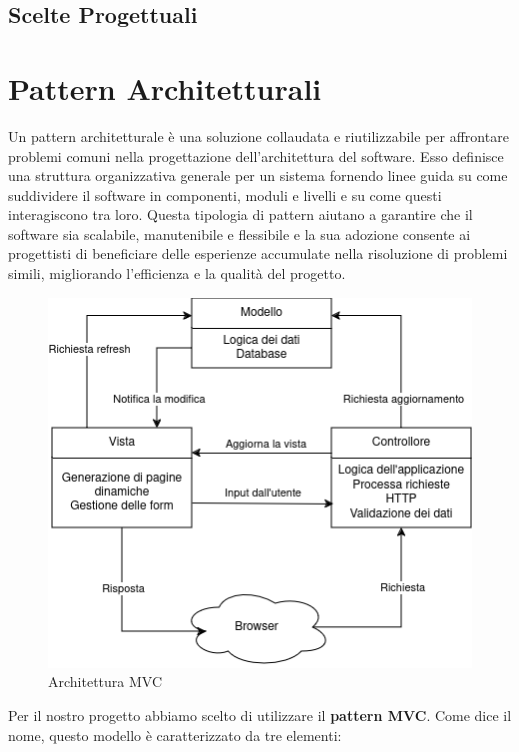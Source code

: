 \documentclass[a4paper, 11pt,oneside]{book}
\newcommand{\spacing}{\par\bigskip\noindent}
\begin{document}
    \section{Scelte Progettuali}


\chapter{Pattern Architetturali}
    Un pattern architetturale è una soluzione collaudata e riutilizzabile per affrontare problemi comuni nella progettazione dell'architettura del software. Esso definisce una struttura organizzativa generale per un sistema fornendo linee guida su come suddividere il software in componenti, moduli e livelli e su come questi interagiscono tra loro.
    Questa tipologia di pattern aiutano a garantire che il software sia scalabile, manutenibile e flessibile e la sua adozione consente ai progettisti di beneficiare delle esperienze accumulate nella risoluzione di problemi simili, migliorando l'efficienza e la qualità del progetto.
    \begin{figure}[H]
        \centering
        \includegraphics[scale=0.75]{Architettura MVC.png}
        \caption{Architettura MVC}
        \label{fig:architettura_mvc}
    \end{figure}
    \spacing
    Per il nostro progetto abbiamo scelto di utilizzare il \textbf{pattern MVC}. Come dice il nome, questo modello è caratterizzato da tre elementi:
\end{document}
